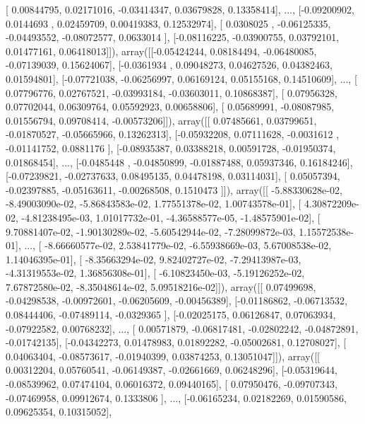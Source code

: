 \documentclass{article}
\begin{document}
       [ 0.00844795,  0.02171016, -0.03414347,  0.03679828,  0.13358414],
       ..., 
       [-0.09200902,  0.0144693 ,  0.02459709,  0.00419383,  0.12532974],
       [ 0.0308025 , -0.06125335, -0.04493552, -0.08072577,  0.0633014 ],
       [-0.08116225, -0.03900755,  0.03792101,  0.01477161,  0.06418013]]), array([[-0.05424244,  0.08184494, -0.06480085, -0.07139039,  0.15624067],
       [-0.0361934 ,  0.09048273,  0.04627526,  0.04382463,  0.01594801],
       [-0.07721038, -0.06256997,  0.06169124,  0.05155168,  0.14510609],
       ..., 
       [ 0.07796776,  0.02767521, -0.03993184, -0.03603011,  0.10868387],
       [ 0.07956328,  0.07702044,  0.06309764,  0.05592923,  0.00658806],
       [ 0.05689991, -0.08087985,  0.01556794,  0.09708414, -0.00573206]]), array([[ 0.07485661,  0.03799651, -0.01870527, -0.05665966,  0.13262313],
       [-0.05932208,  0.07111628, -0.0031612 , -0.01141752,  0.0881176 ],
       [-0.08935387,  0.03388218,  0.00591728, -0.01950374,  0.01868454],
       ..., 
       [-0.0485448 , -0.04850899, -0.01887488,  0.05937346,  0.16184246],
       [-0.07239821, -0.02737633,  0.08495135,  0.04478198,  0.03114031],
       [ 0.05057394, -0.02397885, -0.05163611, -0.00268508,  0.1510473 ]]), array([[ -5.88330628e-02,  -8.49003090e-02,  -5.86843583e-02,
          1.77551378e-02,   1.00743578e-01],
       [  4.30872209e-02,  -4.81238495e-03,   1.01017732e-01,
         -4.36588577e-05,  -1.48575901e-02],
       [  9.70881407e-02,  -1.90130289e-02,  -5.60542944e-02,
         -7.28099872e-03,   1.15572538e-01],
       ..., 
       [ -8.66660577e-02,   2.53841779e-02,  -6.55938669e-03,
          5.67008538e-02,   1.14046395e-01],
       [ -8.35663294e-02,   9.82402727e-02,  -7.29413987e-03,
         -4.31319553e-02,   1.36856308e-01],
       [ -6.10823450e-03,  -5.19126252e-02,   7.67872580e-02,
         -8.35048614e-02,   5.09518216e-02]]), array([[ 0.07499698, -0.04298538, -0.00972601, -0.06205609, -0.00456389],
       [-0.01186862, -0.06713532,  0.08444406, -0.07489114, -0.0329365 ],
       [-0.02025175,  0.06126847,  0.07063934, -0.07922582,  0.00768232],
       ..., 
       [ 0.00571879, -0.06817481, -0.02802242, -0.04872891, -0.01742135],
       [-0.04342273,  0.01478983,  0.01892282, -0.05002681,  0.12708027],
       [ 0.04063404, -0.08573617, -0.01940399,  0.03874253,  0.13051047]]), array([[ 0.00312204,  0.05760541, -0.06149387, -0.02661669,  0.06248296],
       [-0.05319644, -0.08539962,  0.07474104,  0.06016372,  0.09440165],
       [ 0.07950476, -0.09707343, -0.07469958,  0.09912674,  0.1333806 ],
       ..., 
       [-0.06165234,  0.02182269,  0.01590586,  0.09625354,  0.10315052],
\end{document}
